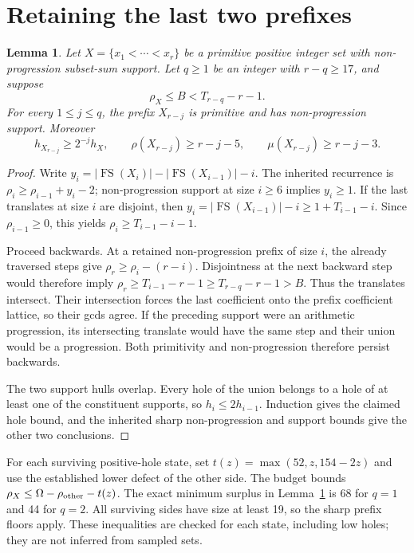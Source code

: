\documentclass[11pt,a4paper]{article}
\newcommand{\FS}{\operatorname{FS}}
\newtheorem{lemma}[theorem]{Lemma}
\begin{document}
\section{Retaining the last two prefixes}
\begin{lemma}\label{retention}
Let $X=\{x_1<\cdots<x_r\}$ be a primitive positive integer set with
non-progression subset-sum support. Let $q\ge1$ be an integer with
$r-q\ge17$, and suppose
\[
 \rho_X\le B<T_{r-q}-r-1.
\]
For every $1\le j\le q$, the prefix $X_{r-j}$ is primitive and
has non-progression support. Moreover
\[
 h_{X_{r-j}}\ge 2^{-j}h_X,\qquad
 \rho(X_{r-j})\ge r-j-5,\qquad
 \mu(X_{r-j})\ge r-j-3.
\]
\end{lemma}
\begin{proof}
Write $y_i=|\FS(X_i)|-|\FS(X_{i-1})|-i$.
The inherited recurrence is $\rho_i\ge\rho_{i-1}+y_i-2$;
non-progression support at size $i\ge6$ implies $y_i\ge1$.
If the last translates at size $i$ are disjoint, then
$y_i=|\FS(X_{i-1})|-i\ge1+T_{i-1}-i$.
Since $\rho_{i-1}\ge0$, this yields
$\rho_i\ge T_{i-1}-i-1$.

Proceed backwards. At a retained non-progression prefix of size $i$,
the already traversed steps give $\rho_r\ge\rho_i-(r-i)$.
Disjointness at the next backward step would therefore imply
$\rho_r\ge T_{i-1}-r-1\ge T_{r-q}-r-1>B$.
Thus the translates intersect. Their intersection forces the last
coefficient onto the prefix coefficient lattice, so their gcds agree.
If the preceding support were an arithmetic progression, its intersecting
translate would have the same step and their union would be a progression.
Both primitivity and non-progression therefore persist backwards.

The two support hulls overlap. Every hole of the union belongs to a
hole of at least one of the constituent supports, so $h_i\le2h_{i-1}$.
Induction gives the claimed hole bound, and the inherited sharp
non-progression and support bounds give the other two conclusions.
\end{proof}

For each surviving positive-hole state, set
$t(z)=\max(52,z,154-2z)$ and use the established lower defect
of the other side. The budget bounds
$\rho_X\le\Omega-\rho_{\rm other}-t(z)$.
The exact minimum surplus in Lemma~\ref{retention} is 68 for $q=1$
and 44 for $q=2$. All surviving sides have size at least 19, so the
sharp prefix floors apply. These inequalities are checked for each
state, including low holes; they are not inferred from sampled sets.
\end{document}
